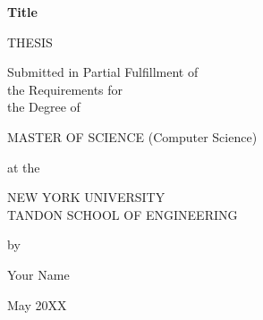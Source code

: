 \documentclass[12pt,letterpaper]{report}
\newcommand{\thesistitle}{Title}
\newcommand{\thesisauthor}{Your Name}
\newcommand{\graddate}{May 20XX} %
\begin{document}
%
\setcounter{page}{1}
\thispagestyle{empty}
%
\begin{center}
{\bfseries 
  {\large\thesistitle}
  \vspace{.25in}
  
  THESIS\\
  \vspace{.25in}
  
  \begin{doublespace}
  Submitted in Partial Fulfillment of\\
  the Requirements for\\
  the Degree of\\
  \end{doublespace}
  \vspace{.25in}
  
  MASTER OF SCIENCE (Computer Science)\\
  \vspace{.25in}
  
  at the \\
  \vspace{.1in}
  
  {\large
  NEW YORK UNIVERSITY\\
  \vspace{-0.05in}
  TANDON SCHOOL OF ENGINEERING\\
  }
  \vspace{.2in}
  
  by
  \vspace{.2in}

  \thesisauthor
  \vspace{.2in}

  \graddate
}

\end{center}

\vspace{0.1in}

\noindent
{}
\vspace{0.01in}

\noindent
\makebox[\textwidth]{\hfill\makebox[2.5in]{\rule[-4pt]{2.5in}{0.1pt}}}\\
\end{document}

